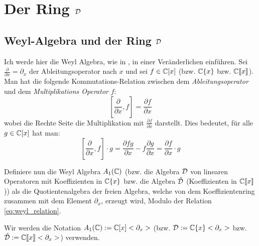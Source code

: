 
\chapter{Der Ring $\mathcal{D}$}

\section{Weyl-Algebra und der Ring $\mathcal{D}$} 
Ich werde hier die Weyl Algebra, wie in
\cite[Chapter~1]{sabbah_cimpa90}, in einer Veränderlichen einführen.
Sei $\frac{\partial}{\partial x}=\partial_x$ der Ableitungsoperator nach $x$
und sei $f \in\mathbb{C}[x]$ (bzw. $\mathbb{C}\{x\}$ bzw. $\mathbb{C}\llbracket x\rrbracket$).
Man hat die folgende Kommutations-Relation zwischen dem
\emph{Ableitungsoperator}
und dem \emph{Multiplikations Operator} $f$:
\begin{equation}\label{eq:weyl_relation}
[\frac{\partial}{\partial x},f]=\frac{\partial f}{\partial x}
\end{equation}
wobei die Rechte Seite die Multiplikation mit $\frac{\partial f}{\partial x}$
darstellt. Dies bedeutet, für alle $g\in\mathbb{C}[x]$ hat man:
\[
[\frac{\partial}{\partial x},f]\cdot g
=\frac{\partial fg}{\partial x} - f\frac{\partial g}{\partial x}
=\frac{\partial f}{\partial x} \cdot g
\]
\begin{defn}
Definiere nun die Weyl Algebra $A_1(\mathbb{C})$ (bzw. die Algebra $\mathcal{D}$ von
linearen Operatoren mit Koeffizienten in $\mathbb{C}\{x\}$ bzw. die Algebra
$\hat{\mathcal{D}}$ (Koeffizienten in $\mathbb{C}\llbracket x\rrbracket$)) als die
Quotientenalgebra der freien Algebra, welche von dem Koeffizientenring
zusammen mit dem Element $\partial_x$, erzeugt wird, Modulo der Relation
\eqref{eq:weyl_relation}.
\end{defn}
\begin{comment}
\begin{defn}
Definiere nun den Ring $\cD_k$ als die
Quotientenalgebra der freien Algebra, welche von dem Koeffizientenring
zusammen mit dem Element $\partial_x$, erzeugt wird, Modulo der Relation
\eqref{eq:weyl_relation}.
Wir schreiben diesen Ring als
\begin{itemize}
\item $A_1(\C)=\C[x]<\partial_x>$ falls $k=\C[x]$, und nennen ihn die
\emph{Weyl Algebra}
\item $\cD=\C\{x\}<\partial_x>$ falls $k=\C\{x\}$
\item $\hat\cD=\Cfx<\partial_x>$ falls $k=\Cfx$
\item $\cD_K=\Ckxl<\partial_x>$ falls
$k=K\overset{\mbox{def}}{=}\C\{x\}[x^{-1}]$
\item $\cD_{\hat K}=\Cfxl<\partial_x>$ falls $k=\hat
K\overset{\mbox{def}}{=}\Cfx[x^{-1}]$
\end{itemize}
\end{defn}
\end{comment}
Wir werden die Notation $A_1(\mathbb{C}):=\mathbb{C}[x]<\partial_x>$ (bzw.
$\mathcal{D}:=\mathbb{C}\{x\}<\partial_x>$ bzw. 
$\hat{\mathcal{D}}:=\mathbb{C}\llbracket x\rrbracket<\partial_x>$) verwenden.

